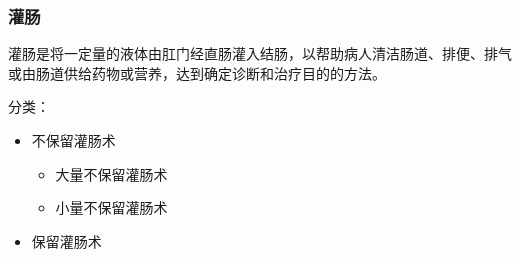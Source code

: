 \documentclass[11pt, a4paper]{ctexart}
\begin{document}
\subsubsection{灌肠}
灌肠是将一定量的液体由肛门经直肠灌入结肠，以帮助病人清洁肠道、排便、排气或由肠道供给药物或营养，达到确定诊断和治疗目的的方法。

分类：
\begin{itemize}
	\item 不保留灌肠术
	      \begin{itemize}
		      \item 大量不保留灌肠术
		      \item 小量不保留灌肠术
	      \end{itemize}
	\item 保留灌肠术
\end{itemize}
\end{document}
